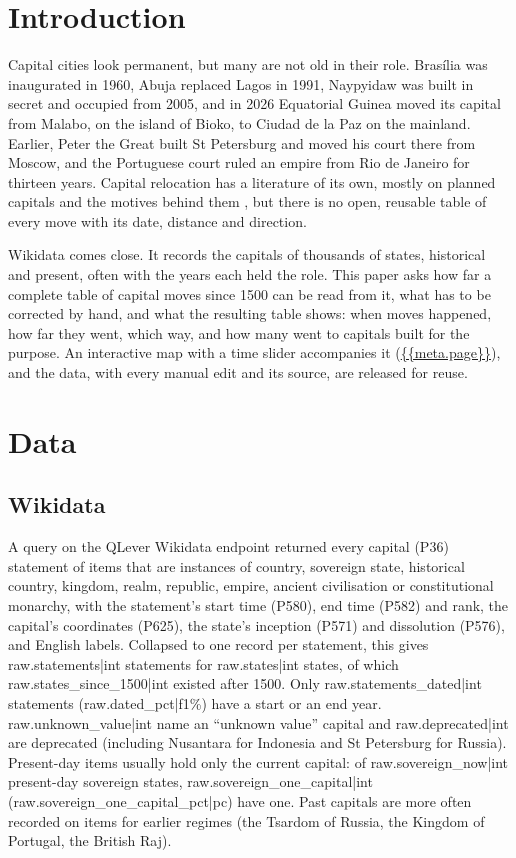 \documentclass[11pt,a4paper]{article}
\begin{document}
\section{Introduction}
Capital cities look permanent, but many are not old in their role. Brasília was inaugurated in 1960, Abuja replaced Lagos in 1991, Naypyidaw was built in secret and occupied from 2005, and in 2026 Equatorial Guinea moved its capital from Malabo, on the island of Bioko, to Ciudad de la Paz on the mainland. Earlier, Peter the Great built St Petersburg and moved his court there from Moscow, and the Portuguese court ruled an empire from Rio de Janeiro for thirteen years. Capital relocation has a literature of its own, mostly on planned capitals and the motives behind them \citep{rossman,schatz,gordon}, but there is no open, reusable table of every move with its date, distance and direction.

Wikidata \citep{wikidata} comes close. It records the capitals of thousands of states, historical and present, often with the years each held the role. This paper asks how far a complete table of capital moves since 1500 can be read from it, what has to be corrected by hand, and what the resulting table shows: when moves happened, how far they went, which way, and how many went to capitals built for the purpose. An interactive map with a time slider accompanies it (\url{{{meta.page}}}), and the data, with every manual edit and its source, are released for reuse.

\section{Data}
\subsection{Wikidata}
A query on the QLever Wikidata endpoint \citep{qlever} returned every capital (P36) statement of items that are instances of country, sovereign state, historical country, kingdom, realm, republic, empire, ancient civilisation or constitutional monarchy, with the statement's start time (P580), end time (P582) and rank, the capital's coordinates (P625), the state's inception (P571) and dissolution (P576), and English labels. Collapsed to one record per statement, this gives {{raw.statements|int}} statements for {{raw.states|int}} states, of which {{raw.states_since_1500|int}} existed after 1500. Only {{raw.statements_dated|int}} statements ({{raw.dated_pct|f1}}\%) have a start or an end year. {{raw.unknown_value|int}} name an ``unknown value'' capital and {{raw.deprecated|int}} are deprecated (including Nusantara for Indonesia and St Petersburg for Russia). Present-day items usually hold only the current capital: of {{raw.sovereign_now|int}} present-day sovereign states, {{raw.sovereign_one_capital|int}} ({{raw.sovereign_one_capital_pct|pc}}) have one. Past capitals are more often recorded on items for earlier regimes (the Tsardom of Russia, the Kingdom of Portugal, the British Raj).
\end{document}

